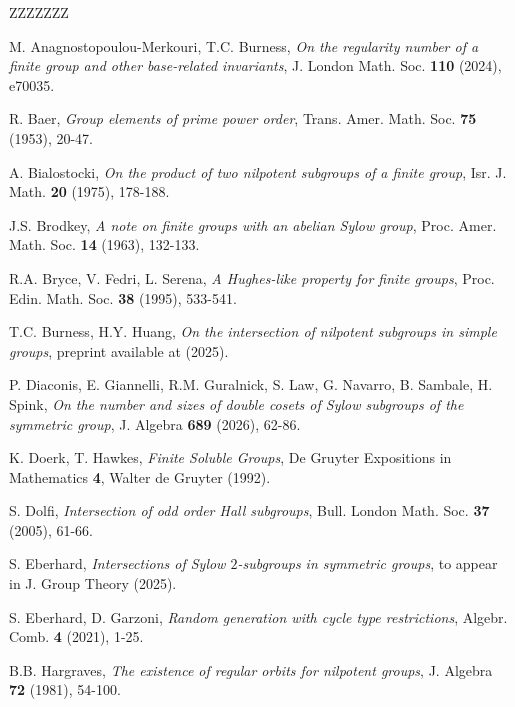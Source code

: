\documentclass[11pt]{amsart}
\numberwithin{equation}{section}
\theoremstyle{definition}
\theoremstyle{remark}
\newcommand{\MYhref}[3][black]{\href{#2}{\color{#1}{#3}}}%
\begin{document}
\vspace{0.1cm}
\begin{thebibliography}{ZZZZZZZ} 

 M. Anagnostopoulou-Merkouri, T.C. Burness,
 \textit{On the regularity number of a finite group and other base-related invariants},
 J. London Math. Soc. \textbf{110} (2024), e70035.

  R. Baer,
 \textit{Group elements of prime power order},
 Trans. Amer. Math. Soc. \textbf{75} (1953), 20-47. 

  A. Bialostocki,
 \textit{On the product of two nilpotent subgroups of a finite group},
 Isr. J. Math. \textbf{20} (1975), 178-188. 
 
   J.S. Brodkey,
 \textit{A note on finite groups with an abelian Sylow group},
 Proc. Amer. Math. Soc. \textbf{14} (1963), 132-133.

  R.A. Bryce, V. Fedri, L. Serena,
 \textit{A Hughes-like property for finite groups},
 Proc. Edin. Math. Soc. \textbf{38} (1995), 533-541.  
 
  T.C. Burness, H.Y. Huang,
  \textit{On the intersection of nilpotent subgroups in simple groups},
  preprint available at \texttt{\MYhref[mypink]{https://arxiv.org/pdf/2508.03479}{arxiv.org/pdf/2508.03479}} (2025).
 
  P. Diaconis, E. Giannelli, R.M. Guralnick, S. Law, G. Navarro, B. Sambale, H. Spink,
  \textit{On the number and sizes of double cosets of Sylow subgroups of the symmetric group},
 J. Algebra \textbf{689} (2026), 62-86.
 
   K. Doerk, T. Hawkes,
  \textit{Finite Soluble Groups},
  De Gruyter Expositions in Mathematics \textbf{4},
  Walter de Gruyter (1992).
  
   S. Dolfi,
  \textit{Intersection of odd order Hall subgroups},
  Bull. London Math. Soc. \textbf{37} (2005), 61-66.
  
   S. Eberhard,
  \textit{Intersections of Sylow $2$-subgroups in symmetric groups},
   to appear in J. Group Theory (2025).

 S. Eberhard, D. Garzoni,
  \textit{Random generation with cycle type restrictions},
  Algebr. Comb. \textbf{4} (2021), 1-25.

  B.B. Hargraves,
 \textit{The existence of regular orbits for nilpotent groups}, 
J. Algebra \textbf{72} (1981), 54-100.


\end{thebibliography}
\end{document}
